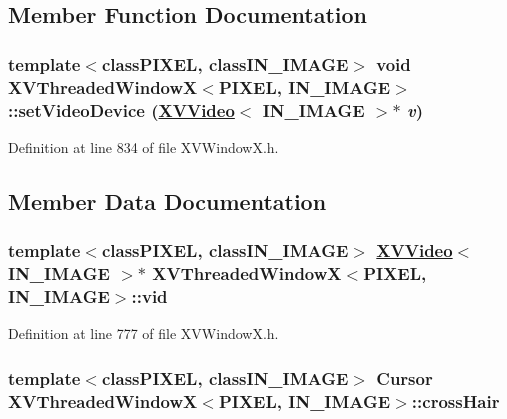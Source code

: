 \subsection{Member Function Documentation}
\label{XVThreadedWindowX_a2}
\hypertarget{class_XVThreadedWindowX_a2}{
\subsubsection[setVideoDevice]{\setlength{\rightskip}{0pt plus 5cm}template$<$classPIXEL, classIN\_\-IMAGE$>$ void XVThreaded\-Window\-X$<$PIXEL, IN\_\-IMAGE$>$::set\-Video\-Device (\hyperlink{class_XVVideo}{XVVideo}$<$ IN\_\-IMAGE $>$$\ast$ {\em v})}}




Definition at line 834 of file XVWindow\-X.h.

\subsection{Member Data Documentation}
\label{XVThreadedWindowX_n0}
\hypertarget{class_XVThreadedWindowX_n0}{
\subsubsection[vid]{\setlength{\rightskip}{0pt plus 5cm}template$<$classPIXEL, classIN\_\-IMAGE$>$ \hyperlink{class_XVVideo}{XVVideo}$<$ IN\_\-IMAGE $>$$\ast$ XVThreaded\-Window\-X$<$PIXEL, IN\_\-IMAGE$>$::vid}}




Definition at line 777 of file XVWindow\-X.h.\label{XVThreadedWindowX_n1}
\hypertarget{class_XVThreadedWindowX_n1}{
\subsubsection[crossHair]{\setlength{\rightskip}{0pt plus 5cm}template$<$classPIXEL, classIN\_\-IMAGE$>$ Cursor XVThreaded\-Window\-X$<$PIXEL, IN\_\-IMAGE$>$::cross\-Hair}}




